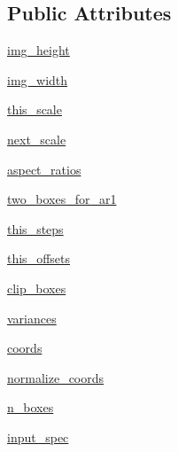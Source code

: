 \subsection*{Public Attributes}
\begin{DoxyCompactItemize}
\item 
\hyperlink{classkeras__utils_1_1keras__layer___anchor_boxes_1_1_anchor_boxes_a2f760ca34099ac8be9e8869362f95295}{img\+\_\+height}
\item 
\hyperlink{classkeras__utils_1_1keras__layer___anchor_boxes_1_1_anchor_boxes_a1e80e372b9345dfd2792b038ee496de9}{img\+\_\+width}
\item 
\hyperlink{classkeras__utils_1_1keras__layer___anchor_boxes_1_1_anchor_boxes_a24e9592f65b944f9d50aeb820b67016c}{this\+\_\+scale}
\item 
\hyperlink{classkeras__utils_1_1keras__layer___anchor_boxes_1_1_anchor_boxes_ae6c10587c354db5c2104b7c18020c001}{next\+\_\+scale}
\item 
\hyperlink{classkeras__utils_1_1keras__layer___anchor_boxes_1_1_anchor_boxes_adf34e7e35d60dd85a2badcb8e0ce9f07}{aspect\+\_\+ratios}
\item 
\hyperlink{classkeras__utils_1_1keras__layer___anchor_boxes_1_1_anchor_boxes_a1c1bd98352cf19dd0ad2d3e573fe06ab}{two\+\_\+boxes\+\_\+for\+\_\+ar1}
\item 
\hyperlink{classkeras__utils_1_1keras__layer___anchor_boxes_1_1_anchor_boxes_a31bea1902b9bad5c14ad74c975586a1f}{this\+\_\+steps}
\item 
\hyperlink{classkeras__utils_1_1keras__layer___anchor_boxes_1_1_anchor_boxes_a0f61985b5286284949ebb7849252c3ae}{this\+\_\+offsets}
\item 
\hyperlink{classkeras__utils_1_1keras__layer___anchor_boxes_1_1_anchor_boxes_a156d64fac26c39b4029b7a1063377853}{clip\+\_\+boxes}
\item 
\hyperlink{classkeras__utils_1_1keras__layer___anchor_boxes_1_1_anchor_boxes_a97efbea33013e4f346616123a6c02f9b}{variances}
\item 
\hyperlink{classkeras__utils_1_1keras__layer___anchor_boxes_1_1_anchor_boxes_a5aa6cd27c22879f898243f55a833d21a}{coords}
\item 
\hyperlink{classkeras__utils_1_1keras__layer___anchor_boxes_1_1_anchor_boxes_a3c2c020df03cacc182a84c96140b3e95}{normalize\+\_\+coords}
\item 
\hyperlink{classkeras__utils_1_1keras__layer___anchor_boxes_1_1_anchor_boxes_ae3b69cf6b4d2f0e425ede0d2aac30821}{n\+\_\+boxes}
\item 
\hyperlink{classkeras__utils_1_1keras__layer___anchor_boxes_1_1_anchor_boxes_a3eb44050c7a18448b40651c143ce3e58}{input\+\_\+spec}
\end{DoxyCompactItemize}


